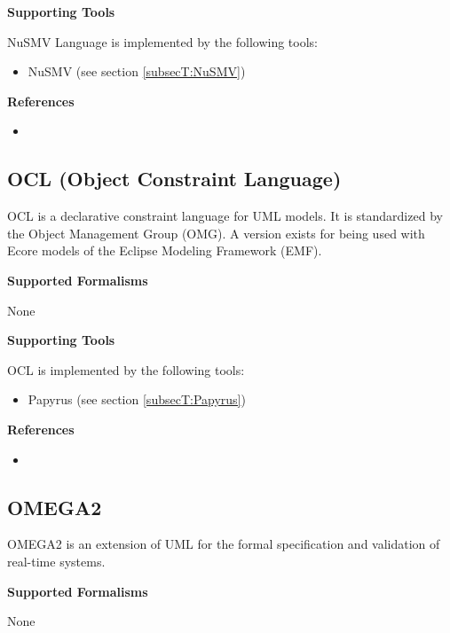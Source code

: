 \textbf{Supporting Tools}

NuSMV Language is implemented by the following tools:
\begin{itemize}
	\item NuSMV (see section \ref{subsecT:NuSMV})
\end{itemize}


\textbf{References}
\begin{itemize}
	
\item {}
\end{itemize}



\subsection{OCL (Object Constraint Language)}
\label{subsecL:OCL}


OCL is a declarative constraint language for UML models. It is standardized by the Object Management Group (OMG). A version exists for being used with Ecore models of the Eclipse Modeling Framework (EMF).

\textbf{Supported Formalisms}

None


\textbf{Supporting Tools}

OCL is implemented by the following tools:
\begin{itemize}
	\item Papyrus (see section \ref{subsecT:Papyrus})
\end{itemize}


\textbf{References}
\begin{itemize}
	
\item {}
\end{itemize}



\subsection{OMEGA2}
\label{subsecL:OMEGA2}


OMEGA2 is an extension of UML for the formal specification and validation of real-time systems.

\textbf{Supported Formalisms}

None


